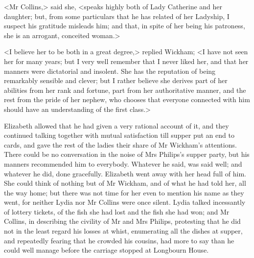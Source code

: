 <Mr Collins,> said she, <speaks highly both of Lady Catherine and her daughter; but, from some particulars that he has related of her Ladyship, I suspect his gratitude misleads him; and that, in spite of her being his patroness, she is an arrogant, conceited woman.>

<I believe her to be both in a great degree,> replied Wickham; <I have not seen her for many years; but I very well remember that I never liked her, and that her manners were dictatorial and insolent. She has the reputation of being remarkably sensible and clever; but I rather believe she derives part of her abilities from her rank and fortune, part from her authoritative manner, and the rest from the pride of her nephew, who chooses that everyone connected with him should have an understanding of the first class.>

Elizabeth allowed that he had given a very rational account of it, and they continued talking together with mutual satisfaction till supper put an end to cards, and gave the rest of the ladies their share of Mr Wickham's attentions. There could be no conversation in the noise of Mrs Philips's supper party, but his manners recommended him to everybody. Whatever he said, was said well; and whatever he did, done gracefully. Elizabeth went away with her head full of him. She could think of nothing but of Mr Wickham, and of what he had told her, all the way home; but there was not time for her even to mention his name as they went, for neither Lydia nor Mr Collins were once silent. Lydia talked incessantly of lottery tickets, of the fish she had lost and the fish she had won; and Mr Collins, in describing the civility of Mr and Mrs Philips, protesting that he did not in the least regard his losses at whist, enumerating all the dishes at supper, and repeatedly fearing that he crowded his cousins, had more to say than he could well manage before the carriage stopped at Longbourn House.